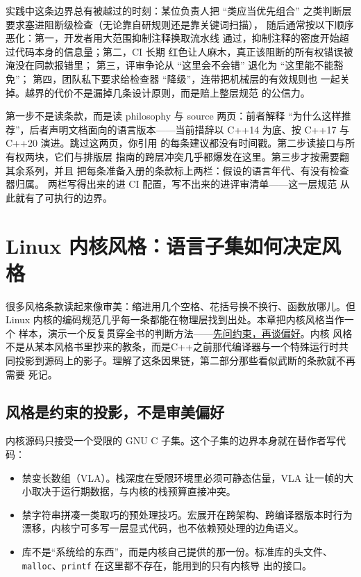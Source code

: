 \documentclass[12pt,a4paper,fontset=fandol]{ctexbook}
\newcommand{\cpp}[1]{C++#1}
\newcommand{\Lang}[1]{\textsf{#1}}
\newcommand{\CPP}{\Lang{C++}}
\begin{document}
\begin{warning}[title={把无法 lint 的条款写进强制 CI 的后果}]
实践中这条边界总有被越过的时刻：某位负责人把 ``类应当优先组合''
之类判断层要求塞进阻断级检查（无论靠自研规则还是靠关键词扫描），
随后通常按以下顺序恶化：第一，开发者用大范围抑制注释换取流水线
通过，抑制注释的密度开始超过代码本身的信息量；第二，CI 长期
红色让人麻木，真正该阻断的所有权错误被淹没在同款报错里；
第三，评审争论从 ``这里会不会错'' 退化为 ``这里能不能豁免''；
第四，团队私下要求给检查器 ``降级''，连带把机械层的有效规则也
一起关掉。越界的代价不是漏掉几条设计原则，而是赔上整层规范
的公信力。
\end{warning}

\begin{guideline}[title={读 Core Guidelines 的正确顺序}]
第一步不是读条款，而是读 philosophy 与 source 两页：前者解释
``为什么这样推荐''，后者声明文档面向的语言版本——当前措辞以
\cpp{14} 为底、按 \cpp{17} 与 \cpp{20} 演进。跳过这两页，你引用
的每条建议都没有时间戳。第二步读接口与所有权两块，它们与排版层
指南的跨层冲突几乎都爆发在这里。第三步才按需要翻其余系列，并且
把每条准备入册的条款标上两栏：假设的语言年代、有没有检查器归属。
两栏写得出来的进 CI 配置，写不出来的进评审清单——这一层规范
从此就有了可执行的边界。
\end{guideline}


\chapter{Linux 内核风格：语言子集如何决定风格}
\label{ch:ch06-kernel}

很多风格条款读起来像审美：缩进用几个空格、花括号换不换行、函数放哪儿。但
Linux 内核的编码规范几乎每一条都能在物理层找到出处。本章把内核风格当作一个
样本，演示一个反复贯穿全书的判断方法——\underline{先问约束，再谈偏好}。内核
风格不是从某本风格书里抄来的教条，而是\CPP 之前那代编译器与一个特殊运行时共
同投影到源码上的影子。理解了这条因果链，第二部分那些看似武断的条款就不再需要
死记。

\section{风格是约束的投影，不是审美偏好}
\label{sec:ch06-projection}

内核源码只接受一个受限的 GNU \Lang{C} 子集。这个子集的边界本身就在替作者写代码：

\begin{itemize}
  \item 禁变长数组（VLA）。栈深度在受限环境里必须可静态估量，VLA 让一帧的大
        小取决于运行期数据，与内核的栈预算直接冲突。
  \item 禁字符串拼凑一类取巧的预处理技巧。宏展开在跨架构、跨编译器版本时行为
        漂移，内核宁可多写一层显式代码，也不依赖预处理的边角语义。
  \item 库不是``系统给的东西''，而是内核自己提供的那一份。标准库的头文件、
        \texttt{malloc}、\texttt{printf} 在这里都不存在，能用到的只有内核导
        出的接口。
\end{itemize}
\end{document}

